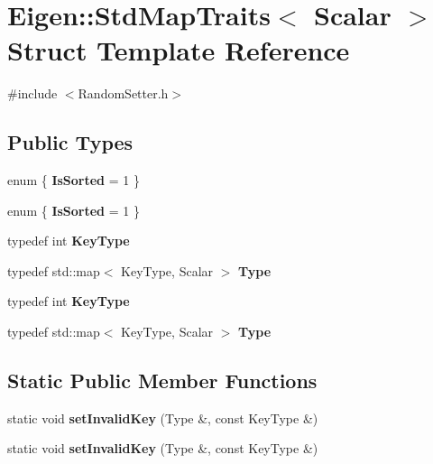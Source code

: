 \hypertarget{struct_eigen_1_1_std_map_traits}{}\section{Eigen\+:\+:Std\+Map\+Traits$<$ Scalar $>$ Struct Template Reference}
\label{struct_eigen_1_1_std_map_traits}


{\ttfamily \#include $<$Random\+Setter.\+h$>$}

\subsection*{Public Types}
\begin{DoxyCompactItemize}
\item 
\mbox{\label{struct_eigen_1_1_std_map_traits_ab30ef1ae88bb2855534caf886bfdd115}} 
enum \{ {\bfseries Is\+Sorted} = 1
 \}
\item 
\mbox{\label{struct_eigen_1_1_std_map_traits_a3a1f37e93f830f88e85ddf1225090849}} 
enum \{ {\bfseries Is\+Sorted} = 1
 \}
\item 
\mbox{\label{struct_eigen_1_1_std_map_traits_a6c09de152172167c17486e8b2b9bbb0b}} 
typedef int {\bfseries Key\+Type}
\item 
\mbox{\label{struct_eigen_1_1_std_map_traits_a26acd9eb0e236b465bd6eb7961fd5871}} 
typedef std\+::map$<$ Key\+Type, Scalar $>$ {\bfseries Type}
\item 
\mbox{\label{struct_eigen_1_1_std_map_traits_a6c09de152172167c17486e8b2b9bbb0b}} 
typedef int {\bfseries Key\+Type}
\item 
\mbox{\label{struct_eigen_1_1_std_map_traits_a26acd9eb0e236b465bd6eb7961fd5871}} 
typedef std\+::map$<$ Key\+Type, Scalar $>$ {\bfseries Type}
\end{DoxyCompactItemize}
\subsection*{Static Public Member Functions}
\begin{DoxyCompactItemize}
\item 
\mbox{\label{struct_eigen_1_1_std_map_traits_ad29d27eabc8f9bc46de9f93504f05059}} 
static void {\bfseries set\+Invalid\+Key} (Type \&, const Key\+Type \&)
\item 
\mbox{\label{struct_eigen_1_1_std_map_traits_ad29d27eabc8f9bc46de9f93504f05059}} 
static void {\bfseries set\+Invalid\+Key} (Type \&, const Key\+Type \&)
\end{DoxyCompactItemize}


